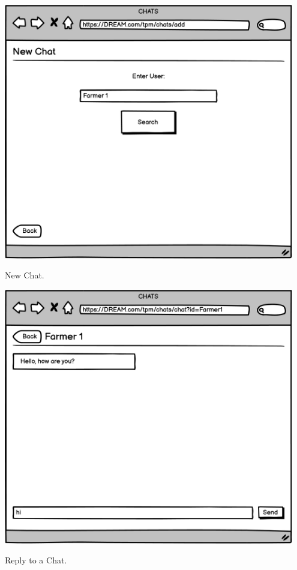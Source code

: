 \vspace{0.5cm}
\begin{minipage}{.5\textwidth}
	\centering
	\includegraphics[width=0.95\textwidth]{Images/Mockup/TPM/07TPMChatAdd.png}
	\captionsetup{type=figure}
	\caption{New Chat.}
\end{minipage}%
\begin{minipage}{.5\textwidth}
	\centering
	\includegraphics[width=0.95\textwidth]{Images/Mockup/TPM/08TPMChatFarmer1.png}
	\captionsetup{type=figure}
	\caption{Reply to a Chat.}
\end{minipage}
